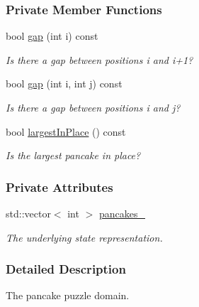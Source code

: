 \subsubsection*{Private Member Functions}
\begin{DoxyCompactItemize}
\item 
bool \hyperlink{structslb_1_1ext_1_1domain_1_1pancake_1_1Pancake_acfff663dd66a330a443f416846d5b704}{gap} (int i) const 
\begin{DoxyCompactList}\small\item\em Is there a gap between positions i and i+1? \end{DoxyCompactList}\item 
bool \hyperlink{structslb_1_1ext_1_1domain_1_1pancake_1_1Pancake_aab62f39be9aa8ea3145cf44081a2fdce}{gap} (int i, int j) const 
\begin{DoxyCompactList}\small\item\em Is there a gap between positions i and j? \end{DoxyCompactList}\item 
bool \hyperlink{structslb_1_1ext_1_1domain_1_1pancake_1_1Pancake_a8b73a2af26cdabcf84946b4b16574f4c}{largest\+In\+Place} () const 
\begin{DoxyCompactList}\small\item\em Is the largest pancake in place? \end{DoxyCompactList}\end{DoxyCompactItemize}
\subsubsection*{Private Attributes}
\begin{DoxyCompactItemize}
\item 
std\+::vector$<$ int $>$ \hyperlink{structslb_1_1ext_1_1domain_1_1pancake_1_1Pancake_a33a991264adb301a17826f6cb4fae0bf}{pancakes\+\_\+}\hypertarget{structslb_1_1ext_1_1domain_1_1pancake_1_1Pancake_a33a991264adb301a17826f6cb4fae0bf}{}\label{structslb_1_1ext_1_1domain_1_1pancake_1_1Pancake_a33a991264adb301a17826f6cb4fae0bf}

\begin{DoxyCompactList}\small\item\em The underlying state representation. \end{DoxyCompactList}\end{DoxyCompactItemize}


\subsubsection{Detailed Description}
The pancake puzzle domain. 

